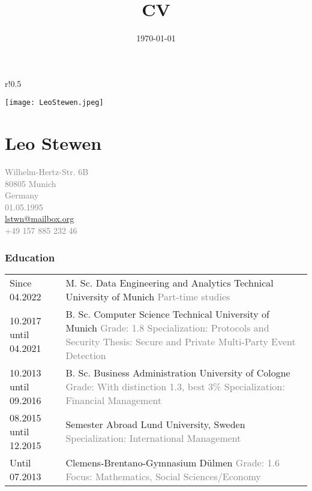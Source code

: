 \documentclass[USenglish]{article} %
\title{CV \name{} \surname{}}
\author{\name{} \surname{}}
\date{\today}
\makeatletter
\newcommand{\surname}{Stewen}
\newcommand{\name}{Leo}
\newcommand{\street}{Wilhelm-Hertz-Str. 6B}
\newcommand{\zip}{80805}
\newcommand{\city}{Munich}
\newcommand{\country}{Germany}
\newcommand{\email}{lstwn@mailbox.org}
\newcommand{\phone}{+49 157 885 232 46}
\newcommand{\birthday}{01.05.1995}
\makeatother
\begin{document}
\begin{wrapfigure}{r!}{0.5\textwidth}
  \begin{flushright}
    \texttt{[image: LeoStewen.jpeg]}
  \end{flushright}\label{img:passphoto}
\end{wrapfigure}

\section*{\name{} \surname{}}
\textcolor{gray}{
  \street{}\\
  \zip{} \city{}\\
  \country{}\\
  \birthday{}\\
  \href{mailto:\email?subject=Curriculum\%20Vitae\%20\name\%20\surname}{\email}\\
  \phone{}
  \bigskip
  \bigskip
  \bigskip
  \bigskip
}

\subsubsection*{Education}
\begin{table}[h]
\begin{tabularx}{\textwidth}{@{}p{4cm}X}

  Since 04.2022 &
  M. Sc. Data Engineering and Analytics \textbar{} Technical University of Munich
  \textcolor{gray}{
    \newline Part-time studies} \\

  10.2017 until 04.2021 &
  B. Sc. Computer Science \textbar{} Technical University of Munich
  \textcolor{gray}{
    \newline Grade: 1.8
    \newline Specialization: Protocols and Security
    \newline Thesis: Secure and Private Multi-Party Event Detection} \\

  10.2013 until 09.2016 &
  B. Sc. Business Administration \textbar{} University of Cologne
  \textcolor{gray}{
    \newline Grade: With distinction 1.3, best 3\%
    \newline Specialization: Financial Management} \\

  08.2015 until 12.2015 &
  Semester Abroad \textbar{} Lund University, Sweden
  \textcolor{gray}{
    \newline Specialization: International Management} \\

  Until 07.2013         &
  Clemens-Brentano-Gymnasium \textbar{} Dülmen
  \textcolor{gray}{
    \newline Grade: 1.6
    \newline Focus: Mathematics, Social Sciences/Economy} \\

\end{tabularx}\label{tab:education}
\end{table}
\end{document}
